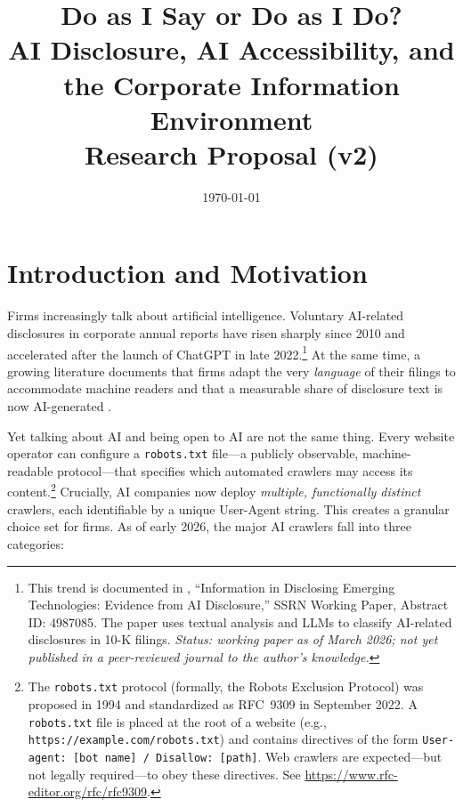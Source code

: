 \documentclass[12pt,a4paper]{article}
\title{\textbf{Do as I Say or Do as I Do? \\ AI Disclosure, AI Accessibility, and the Corporate Information Environment}\\
\vspace{0.5cm}
\large Research Proposal (v2)}
\author{}
\date{\today}
\begin{document}
\maketitle

\section{Introduction and Motivation}

Firms increasingly talk about artificial intelligence. Voluntary AI-related disclosures in corporate annual reports have risen sharply since 2010 and accelerated after the launch of ChatGPT in late 2022.\footnote{This trend is documented in \citet{CaoLiuQiuZhao2024}, ``Information in Disclosing Emerging Technologies: Evidence from AI Disclosure,'' SSRN Working Paper, Abstract ID: 4987085. The paper uses textual analysis and LLMs to classify AI-related disclosures in 10-K filings. \textit{Status: working paper as of March 2026; not yet published in a peer-reviewed journal to the author's knowledge.}} At the same time, a growing literature documents that firms adapt the very \emph{language} of their filings to accommodate machine readers \citep{CaoJiangYangZhang2023} and that a measurable share of disclosure text is now AI-generated \citep{BlankespoorDeHaanLi2024}.

Yet talking about AI and being open to AI are not the same thing. Every website operator can configure a \texttt{robots.txt} file---a publicly observable, machine-readable protocol---that specifies which automated crawlers may access its content.\footnote{The \texttt{robots.txt} protocol (formally, the Robots Exclusion Protocol) was proposed in 1994 and standardized as RFC~9309 in September 2022. A \texttt{robots.txt} file is placed at the root of a website (e.g., \texttt{https://example.com/robots.txt}) and contains directives of the form \texttt{User-agent: [bot name] / Disallow: [path]}. Web crawlers are expected---but not legally required---to obey these directives. See \url{https://www.rfc-editor.org/rfc/rfc9309}.} Crucially, AI companies now deploy \emph{multiple, functionally distinct} crawlers, each identifiable by a unique User-Agent string. This creates a granular choice set for firms. As of early 2026, the major AI crawlers fall into three categories:
\end{document}
